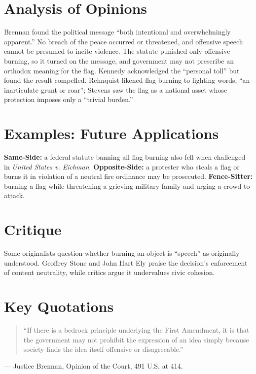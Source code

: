 \documentclass[12pt]{article}
\begin{document}
\section{Analysis of Opinions}
Brennan found the political message ``both intentional and overwhelmingly apparent.'' No breach of the peace occurred or threatened, and offensive speech cannot be presumed to incite violence. The statute punished only offensive burning, so it turned on the message, and government may not prescribe an orthodox meaning for the flag. Kennedy acknowledged the ``personal toll'' but found the result compelled. Rehnquist likened flag burning to fighting words, ``an inarticulate grunt or roar''; Stevens saw the flag as a national asset whose protection imposes only a ``trivial burden.''

\section{Examples: Future Applications}
\textbf{Same-Side:} a federal statute banning all flag burning also fell when challenged in \textit{United States v. Eichman}. \textbf{Opposite-Side:} a protester who steals a flag or burns it in violation of a neutral fire ordinance may be prosecuted. \textbf{Fence-Sitter:} burning a flag while threatening a grieving military family and urging a crowd to attack.

\section{Critique}
Some originalists question whether burning an object is ``speech'' as originally understood. Geoffrey Stone and John Hart Ely praise the decision's enforcement of content neutrality, while critics argue it undervalues civic cohesion.

\section{Key Quotations}
\begin{quote}
``If there is a bedrock principle underlying the First Amendment, it is that the government may not prohibit the expression of an idea simply because society finds the idea itself offensive or disagreeable.''
\end{quote}
\noindent --- Justice Brennan, Opinion of the Court, 491 U.S. at 414.
\end{document}
